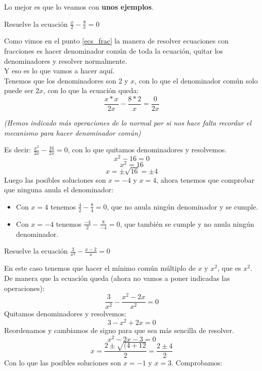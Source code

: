 \documentclass[a4paper,11pt,answers]{exam}
\begin{document}
Lo mejor es que lo veamos con \textbf{unos ejemplos}.
\begin{questions}
\question Resuelve la ecuación $\frac{x}{2} - \frac{8}{x} = 0$
  \begin{solution}
    Como vimos en el punto \ref{ecs_frac} la manera de resolver ecuaciones con fracciones es
    hacer denominador común de toda la ecuación, quitar los denominadores y resolver normalmente.\\
    Y eso es lo que vamos a hacer aquí.\\

    Tenemos que los denominadores son 2 y $x$, con lo que el denominador común solo puede ser $2x$,
    con lo que la ecuación queda:
    \[\frac{x*x}{2x} - \frac{8*2}{x} = \frac{0}{2x}\]
    \begin{center}
      \begin{small}
        \emph{(Hemos indicado más operaciones de lo normal por si nos hace falta recordar
          el mecanismo para hacer denominador común)}
      \end{small}
    \end{center}
    Es decir: $\frac{x^2}{2x}- \frac{16}{2x} = 0$, con lo que quitamos denominadores y resolvemos.
    \[x^2 - 16 = 0\]
    \[x^2 = 16\]
    \[x = \pm \sqrt{16} = \pm 4\]
    Luego las posibles soluciones son $x=-4$ y $x=4$, ahora tenemos que comprobar que ninguna anula
    el denominador:
    \begin{itemize}
    \item Con $x=4$ tenemos $\frac{4}{2}- \frac{8}{4} = 0$, que no anula ningún denominador y
      se cumple.
    \item Con $x = -4$ tenemos $\frac{-4}{2}- \frac{8}{-4} = 0$, que también se cumple y no anula
      ningún denominador.
    \end{itemize}
  \end{solution}
\question Resuelve la ecuación $\frac{3}{x^2} - \frac{x-2}{x} = 0$
  \begin{solution}
    En este caso tenemos que hacer el mínimo común múltiplo de $x$ y $x^2$, que es $x^2$. De manera que la ecuación queda (ahora no vamos a poner indicadas las operaciones):
    \[\frac{3}{x^2} - \frac{x^2 - 2x}{x^2} = 0\]
    Quitamos denominadores y resolvemos:
    \[3 - x^2 + 2x = 0\]
    Reordenamos y cambiamos de signo para que sea más sencilla de resolver.
    \[x^2 - 2x - 3 = 0\]
    \[x = \frac{2\pm\sqrt{(4 + 12}}{2} = \frac{2 \pm 4}{2}\]
    Con lo que las posibles soluciones son $x = -1$ y $x = 3$. Comprobamos:
    \begin{itemize}

\end{itemize}
\end{solution}
\end{questions}
\end{document}
